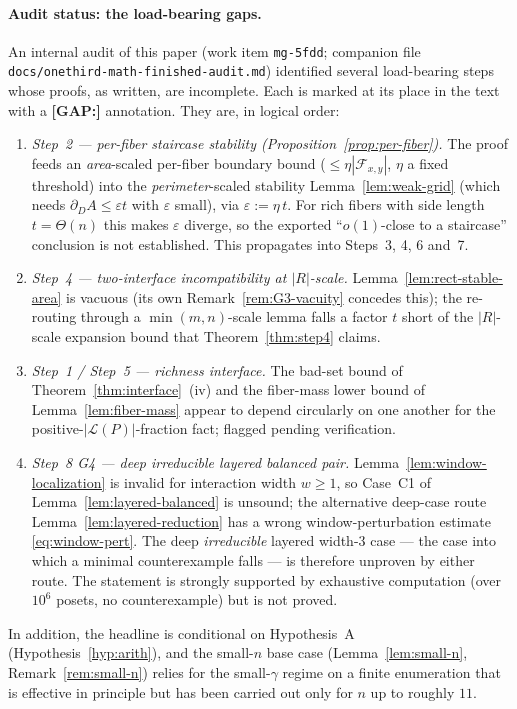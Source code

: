 \documentclass[11pt]{article}
\theoremstyle{definition}
\theoremstyle{remark}
\newcommand{\bd}{\partial}
\newcommand{\fiber}[1]{\mathcal{F}_{#1}}
\begin{document}
\paragraph{Audit status: the load-bearing gaps.}\label{sec:roadmap-residual}
An internal audit of this paper (work item \texttt{mg-5fdd};
companion file \texttt{docs/onethird-math-finished-audit.md})
identified several load-bearing steps whose proofs, as written, are
incomplete. Each is marked at its place in the text with a
\textbf{[GAP:]} annotation. They are, in logical order:
\begin{enumerate}\setlength{\itemsep}{2pt}
  \item \emph{Step~2 --- per-fiber staircase stability
  (Proposition~\ref{prop:per-fiber}).} The proof feeds an
  \emph{area}-scaled per-fiber boundary bound ($\le\eta|\fiber{x,y}|$,
  $\eta$ a fixed threshold) into the \emph{perimeter}-scaled stability
  Lemma~\ref{lem:weak-grid} (which needs $\bd_D A\le\varepsilon t$
  with $\varepsilon$ small), via $\varepsilon:=\eta\,t$. For rich
  fibers with side length $t=\Theta(n)$ this makes $\varepsilon$
  diverge, so the exported ``$o(1)$-close to a staircase'' conclusion
  is not established. This propagates into Steps~3, 4, 6 and~7.
  \item \emph{Step~4 --- two-interface incompatibility at $|R|$-scale.}
  Lemma~\ref{lem:rect-stable-area} is vacuous (its own
  Remark~\ref{rem:G3-vacuity} concedes this); the re-routing through a
  $\min(m,n)$-scale lemma falls a factor $t$ short of the $|R|$-scale
  expansion bound that Theorem~\ref{thm:step4} claims.
  \item \emph{Step~1 / Step~5 --- richness interface.} The bad-set
  bound of Theorem~\ref{thm:interface}~(iv) and the fiber-mass lower
  bound of Lemma~\ref{lem:fiber-mass} appear to depend circularly on
  one another for the positive-$|\mathcal L(P)|$-fraction fact;
  flagged pending verification.
  \item \emph{Step~8 G4 --- deep irreducible layered balanced pair.}
  Lemma~\ref{lem:window-localization} is invalid for interaction
  width $w\ge1$, so Case~C1 of Lemma~\ref{lem:layered-balanced} is
  unsound; the alternative deep-case route
  Lemma~\ref{lem:layered-reduction} has a wrong window-perturbation
  estimate \eqref{eq:window-pert}. The deep \emph{irreducible} layered
  width-$3$ case --- the case into which a minimal counterexample
  falls --- is therefore unproven by either route. The statement is
  strongly supported by exhaustive computation (over $10^6$ posets, no
  counterexample) but is not proved.
\end{enumerate}
In addition, the headline is conditional on Hypothesis~A
(Hypothesis~\ref{hyp:arith}), and the small-$n$ base case
(Lemma~\ref{lem:small-n}, Remark~\ref{rem:small-n}) relies for the
small-$\gamma$ regime on a finite enumeration that is effective in
principle but has been carried out only for $n$ up to roughly $11$.
\end{document}

